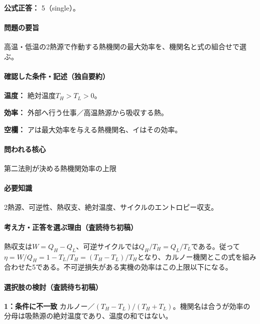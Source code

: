\textbf{公式正答：} 5（single）。

\paragraph{問題の要旨} 高温・低温の2熱源で作動する熱機関の最大効率を、機関名と式の組合せで選ぶ。

\paragraph{確認した条件・記述（独自要約）}\mbox{}\par

\noindent\textbf{温度：} 絶対温度\(T_H>T_L>0\)。\par

\noindent\textbf{効率：} 外部へ行う仕事／高温熱源から吸収する熱。\par

\noindent\textbf{空欄：} アは最大効率を与える熱機関名、イはその効率。\par

\paragraph{問われる核心} 第二法則が決める熱機関効率の上限

\paragraph{必要知識} 2熱源、可逆性、熱収支、絶対温度、サイクルのエントロピー収支。

\paragraph{考え方・正答を選ぶ理由（査読待ち初稿）} 熱収支は\(W=Q_H-Q_L\)、可逆サイクルでは\(Q_H/T_H=Q_L/T_L\)である。従って\(\eta=W/Q_H=1-T_L/T_H=(T_H-T_L)/T_H\)となり、カルノー機関とこの式を組み合わせた5である。不可逆損失がある実機の効率はこの上限以下になる。

\paragraph{選択肢の検討（査読待ち初稿）}\mbox{}\par

\noindent\textbf{1：条件に不一致} カルノー／\((T_H-T_L)/(T_H+T_L)\)。機関名は合うが効率の分母は吸熱源の絶対温度であり、温度の和ではない。\par

